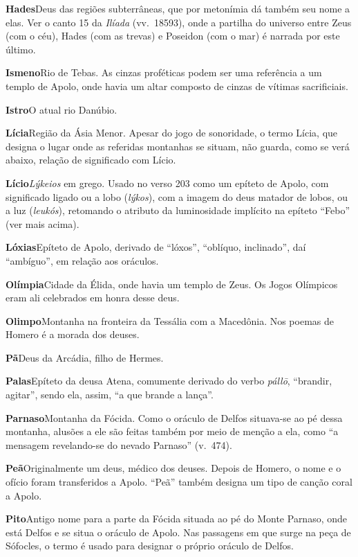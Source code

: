 \textbf{Hades}\quad Deus das regiões subterrâneas, que por metonímia dá
também seu nome a elas. Ver o canto 15 da \emph{Ilíada} (vv.~18593),
onde a partilha do universo entre Zeus (com o céu), Hades (com as
trevas) e Poseidon (com o mar) é narrada por este último.

\textbf{Ismeno}\quad Rio de Tebas. As cinzas proféticas podem ser uma
referência a um templo de Apolo, onde havia um altar composto de cinzas
de vítimas sacrificiais.

\textbf{Istro}\quad O atual rio Danúbio.

\textbf{Lícia}\quad Região da Ásia Menor. Apesar do jogo de sonoridade,
o termo Lícia, que designa o lugar onde as referidas montanhas se
situam, não guarda, como se verá abaixo, relação de significado com
Lício.

\textbf{Lício}\quad \emph{Lýkeios} em grego. Usado no verso 203 como um
epíteto de Apolo, com significado ligado ou a lobo (\emph{lýkos}), com a
imagem do deus matador de lobos, ou a luz (\emph{leukós}), retomando o
atributo da luminosidade implícito na epíteto ``Febo'' (ver mais acima).

\textbf{Lóxias}\quad Epíteto de Apolo, derivado de ``lóxos'', ``oblíquo,
inclinado'', daí ``ambíguo'', em relação aos oráculos.

\textbf{Olímpia}\quad Cidade da Élida, onde havia um templo de Zeus. Os
Jogos Olímpicos eram ali celebrados em honra desse deus.

\textbf{Olimpo}\quad Montanha na fronteira da Tessália com a Macedônia.
Nos poemas de Homero é a morada dos deuses.

\textbf{Pã}\quad Deus da Arcádia, filho de Hermes.

\textbf{Palas}\quad Epíteto da deusa Atena, comumente derivado do verbo
\emph{pállō}, ``brandir, agitar'', sendo ela, assim, ``a que brande a
lança''.

\textbf{Parnaso}\quad Montanha da Fócida. Como o oráculo de Delfos
situava-se ao pé dessa montanha, alusões a ele são feitas também por
meio de menção a ela, como ``a mensagem revelando-se do nevado Parnaso''
(v.~474).

\textbf{Peã}\quad Originalmente um deus, médico dos deuses. Depois de
Homero, o nome e o ofício foram transferidos a Apolo. ``Peã'' também
designa um tipo de canção coral a Apolo.

\textbf{Pito}\quad Antigo nome para a parte da Fócida situada ao pé do
Monte Parnaso, onde está Delfos e se situa o oráculo de Apolo. Nas
passagens em que surge na peça de Sófocles, o termo é usado para
designar o próprio oráculo de Delfos.

